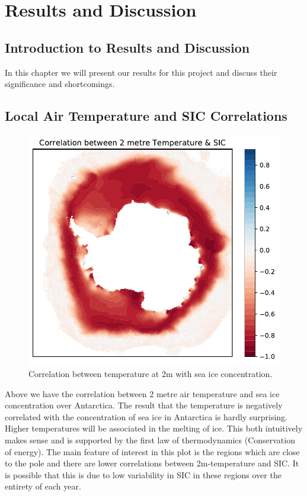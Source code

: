 \chapter{Results and Discussion}
\label{Chap:Results}

\section{Introduction to Results and Discussion}
In this chapter we will present our results for this project and discuss their significance and shortcomings.

\section{Local Air Temperature and SIC Correlations}
\begin{figure}[H]
    \centering
    \includegraphics{Images/tempcorrwithsic.pdf}
    \caption{Correlation between temperature at 2m with sea ice concentration.}
    \label{fig:results:2mtemp_corr_with_sic}
\end{figure}
Above we have the correlation between 2 metre air temperature and sea ice concentration over Antarctica. The result that the temperature is negatively correlated with the concentration of sea ice in Antarctica is hardly surprising. Higher temperatures will be associated in the melting of ice. This both intuitively makes sense and is supported by the first law of thermodynamics (Conservation of energy). The main feature of interest in this plot is the regions which are close to the pole and there are lower correlations between 2m-temperature and SIC. It is possible that this is due to low variability in SIC in these regions over the entirety of each year.


